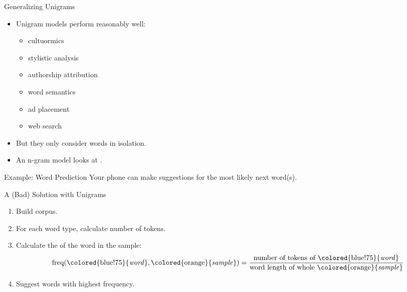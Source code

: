 \documentclass[professionalfonts, xcolor={usenames,svgnames,x11names,table}]{beamer}
\begin{document}
\begin{frame}{Generalizing Unigrams}
    \begin{itemize}
        \item Unigram models perform reasonably well:
            \begin{itemize}
                \item cultuormics
                \item stylistic analysis
                \item authorship attribution
                \item word semantics
                \item ad placement
                \item web search
            \end{itemize}
        \item But they only consider words in isolation.
        \item An n-gram model looks at .
    \end{itemize}
\end{frame}

\begin{frame}{Example: Word Prediction}
    Your phone can make suggestions for the most likely next word(s).

    \begin{block}{A (Bad) Solution with Unigrams}
       \begin{enumerate}
            \item Build corpus.
            \item For each word type, calculate number of tokens.
            \item Calculate the  of the word in the sample:
                \[
                    \text{freq}(
                        \text{\colored{blue!75}{\emph{word}}},
                        \text{\colored{orange}{\emph{sample}}}
                        )
                    =
                    \frac{%
                        \text{number of tokens of \colored{blue!75}{\emph{word}}}}
                        {\text{word length of whole \colored{orange}{\emph{sample}}}}
                \]
            \item Suggest words with highest frequency.
       \end{enumerate} 
    \end{block}
\end{frame}
\end{document}

